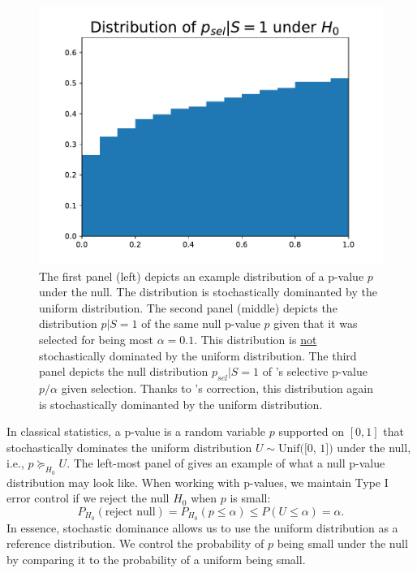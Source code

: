 \documentclass{article}
\begin{document}
\begin{figure}[]
{\begin{minipage}{0.33\textwidth}
        \centering
        \includegraphics[width=\textwidth]{p_sel_dist_given.pdf}
    \end{minipage}
    }
    \caption{The first panel (left) depicts an example distribution of a p-value $p$ under the null. The distribution is stochastically dominanted by the uniform distribution. The second panel (middle) depicts the distribution $p | S = 1$ of the same null p-value $p$ given that it was selected for being most $\alpha=0.1$. This distribution is \underline{not} stochastically dominated by the uniform distribution. The third panel depicts the null distribution $p_{sel}|S=1$ of 's selective p-value $p/\alpha$ given selection. Thanks to 's correction, this distribution again is stochastically dominanted by the uniform distribution.}
    \label{fig:distributions}
\end{figure}

In classical statistics, a p-value is a random variable $p$ supported on $[0, 1]$ that stochastically dominates the uniform distribution $U \sim \text{Unif([0, 1])}$ under the null, i.e., $p \succeq_{H_0} U$. The left-most panel of  gives an example of what a null p-value distribution may look like. When working with p-values, we maintain Type I error control if we reject the null $H_0$ when $p$ is small:
\begin{equation*}
    P_{H_0}(\text{reject null}) = P_{H_0}(p \leq \alpha) \leq P(U \leq \alpha)  = \alpha.
\end{equation*}
In essence, stochastic dominance allows us to use the uniform distribution as a reference distribution. We control the probability of $p$ being small under the null by comparing it to the probability of a uniform being small. 
\end{document}
